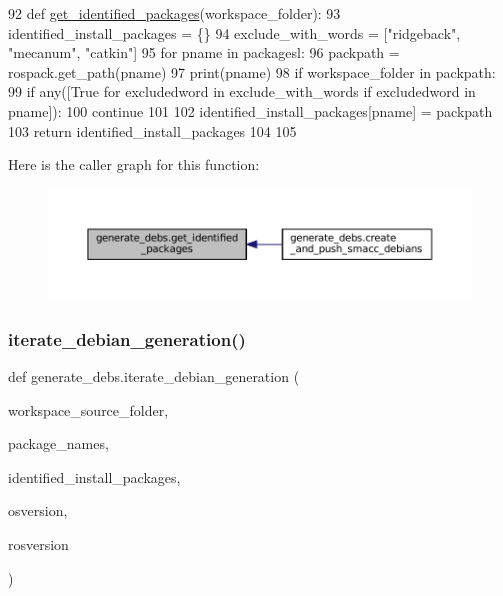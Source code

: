 \begin{DoxyCode}
92 \textcolor{keyword}{def }\hyperlink{namespacegenerate__debs_aa91b87c6d9c3ed04015845cc9298431a}{get\_identified\_packages}(workspace\_folder):
93     identified\_install\_packages = \{\}
94     exclude\_with\_words = [\textcolor{stringliteral}{"ridgeback"}, \textcolor{stringliteral}{"mecanum"}, \textcolor{stringliteral}{"catkin"}]
95     \textcolor{keywordflow}{for} pname \textcolor{keywordflow}{in} packagesl:
96         packpath = rospack.get\_path(pname)
97         print(pname)
98         \textcolor{keywordflow}{if} workspace\_folder \textcolor{keywordflow}{in} packpath:
99             \textcolor{keywordflow}{if} any([\textcolor{keyword}{True} \textcolor{keywordflow}{for} excludedword \textcolor{keywordflow}{in} exclude\_with\_words \textcolor{keywordflow}{if} excludedword \textcolor{keywordflow}{in} pname]):
100                 \textcolor{keywordflow}{continue}
101 
102             identified\_install\_packages[pname] = packpath
103     \textcolor{keywordflow}{return} identified\_install\_packages
104 
105 
\end{DoxyCode}
Here is the caller graph for this function\+:
\nopagebreak
\begin{figure}[H]
\begin{center}
\leavevmode
\includegraphics[width=350pt]{namespacegenerate__debs_aa91b87c6d9c3ed04015845cc9298431a_icgraph}
\end{center}
\end{figure}
\mbox{\label{namespacegenerate__debs_a2615a6fc7860b6aa9e920e6b4d886589}} 
\subsubsection{\texorpdfstring{iterate\+\_\+debian\+\_\+generation()}{iterate\_debian\_generation()}}
{\footnotesize\ttfamily def generate\+\_\+debs.\+iterate\+\_\+debian\+\_\+generation (\begin{DoxyParamCaption}\item[{}]{workspace\+\_\+source\+\_\+folder,  }\item[{}]{package\+\_\+names,  }\item[{}]{identified\+\_\+install\+\_\+packages,  }\item[{}]{osversion,  }\item[{}]{rosversion }\end{DoxyParamCaption})}



